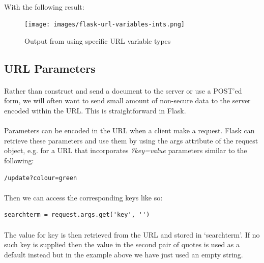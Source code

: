 \documentclass[12pt, a4paper, oneside]{book}
\begin{document}
\paragraph{} With the following result:

\begin{figure}[H]
\centering
\texttt{[image: images/flask-url-variables-ints.png]}
\caption{Output from using specific URL variable types}
\label{fig:flask-url-variables-ints}
\end{figure}



\subsection{URL Parameters}
\label{url-parameters}
\paragraph{} Rather than construct and send a document to the server or use a POST'ed form, we will often want to send small amount of non-secure data to the server encoded within the URL. This is straightforward in Flask. 

\paragraph{} Parameters can be encoded in the URL when a client make a request. Flask can retrieve these parameters and use them by using the args attribute of the request object, e.g. for a URL that incorporates \emph{?key=value} parameters similar to the following:

\begin{lstlisting}[style=DOS]
/update?colour=green
\end{lstlisting}

\paragraph{} Then we can access the corresponding keys like so:

\begin{lstlisting}
searchterm = request.args.get('key', '')
\end{lstlisting}

\paragraph{} The value for key is then retrieved from the URL and stored in `searchterm'. If no such key is supplied then the value in the second pair of quotes is used as a default instead but in the example above we have just used an empty string.
\end{document}
